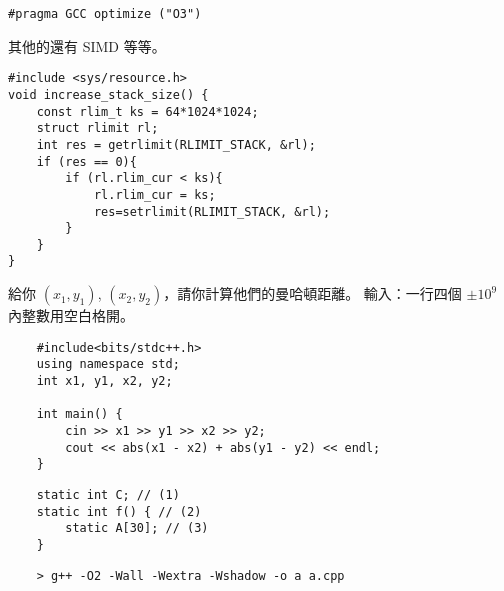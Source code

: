 \documentclass[standalone]{beamer}
\begin{document}


\begin{frame}[fragile]{}
  \begin{verbatim}
#pragma GCC optimize ("O3") 
  \end{verbatim}
  \pause

  其他的還有 SIMD 等等。
\end{frame}

\begin{frame}[fragile]{}
  \begin{verbatim}
#include <sys/resource.h>
void increase_stack_size() {
    const rlim_t ks = 64*1024*1024;
    struct rlimit rl;
    int res = getrlimit(RLIMIT_STACK, &rl);
    if (res == 0){
        if (rl.rlim_cur < ks){
            rl.rlim_cur = ks;
            res=setrlimit(RLIMIT_STACK, &rl);
        }
    }
}
  \end{verbatim}
\end{frame}

\begin{frame}[fragile]{}
  \begin{problem}
    給你 $(x_1, y_1)$, $(x_2, y_2)$，請你計算他們的曼哈頓距離。
    輸入：一行四個 $\pm 10^9$ 內整數用空白格開。
  \end{problem} \pause \disskip
  \begin{verbatim}
    #include<bits/stdc++.h>
    using namespace std;
    int x1, y1, x2, y2;

    int main() {
        cin >> x1 >> y1 >> x2 >> y2;
        cout << abs(x1 - x2) + abs(y1 - y2) << endl;
    }
  \end{verbatim} 
\end{frame}

\begin{frame}[fragile]{}
  \onslide<+->
  \begin{verbatim}
    static int C; // (1)
    static int f() { // (2)
        static A[30]; // (3)
    }
  \end{verbatim} 
  \onslide<+->
  \begin{verbatim}
    > g++ -O2 -Wall -Wextra -Wshadow -o a a.cpp
  \end{verbatim} 
\end{frame}
\end{document}
